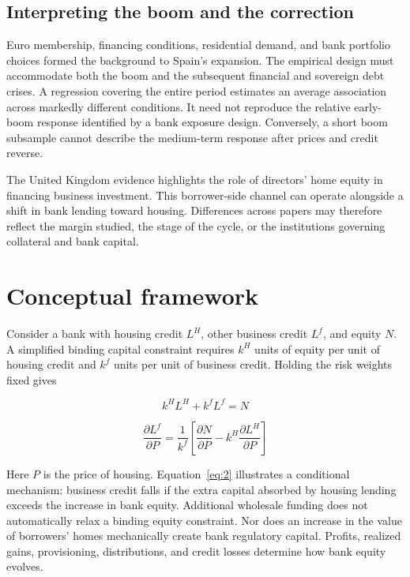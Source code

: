 \documentclass[11pt,letterpaper]{article}
\begin{document}
\subsection{Interpreting the boom and the correction}

Euro membership, financing conditions, residential demand, and bank portfolio choices formed the background to Spain's expansion. The empirical design must accommodate both the boom and the subsequent financial and sovereign debt crises. A regression covering the entire period estimates an average association across markedly different conditions. It need not reproduce the relative early-boom response identified by a bank exposure design. Conversely, a short boom subsample cannot describe the medium-term response after prices and credit reverse.


The United Kingdom evidence highlights the role of directors' home equity in financing business investment. This borrower-side channel can operate alongside a shift in bank lending toward housing. Differences across papers may therefore reflect the margin studied, the stage of the cycle, or the institutions governing collateral and bank capital.


\section{Conceptual framework}

Consider a bank with housing credit $L^H$, other business credit $L^f$, and equity $N$. A simplified binding capital constraint requires $k^H$ units of equity per unit of housing credit and $k^f$ units per unit of business credit. Holding the risk weights fixed gives


\begin{equation}\label{eq:1}
k^H L^H+k^f L^f=N
\end{equation}

\begin{equation}\label{eq:2}
\frac{\partial L^f}{\partial P}=\frac{1}{k^f}\left[\frac{\partial N}{\partial P}-k^H\frac{\partial L^H}{\partial P}\right]
\end{equation}

Here $P$ is the price of housing. Equation~\eqref{eq:2} illustrates a conditional mechanism: business credit falls if the extra capital absorbed by housing lending exceeds the increase in bank equity. Additional wholesale funding does not automatically relax a binding equity constraint. Nor does an increase in the value of borrowers' homes mechanically create bank regulatory capital. Profits, realized gains, provisioning, distributions, and credit losses determine how bank equity evolves.
\end{document}
